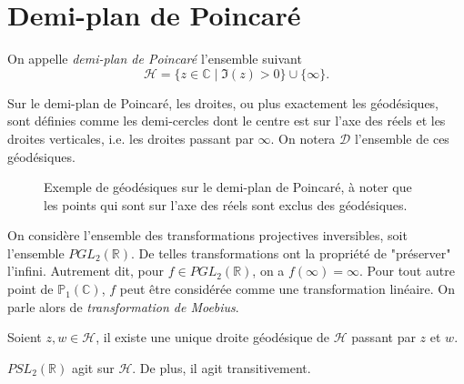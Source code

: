 \documentclass[../main.tex]{subfiles}
\begin{document}
\section{Demi-plan de Poincaré}

\begin{definition}
    On appelle \emph{demi-plan de Poincaré} l'ensemble suivant
    \begin{equation}
        \mathcal{H} = \{ z \in \mathbb{C} \mid \Im(z) > 0 \}\cup \{\infty\}.
    \end{equation}
\end{definition}
Sur le demi-plan de Poincaré, les droites, ou plus exactement les géodésiques, 
sont définies comme les demi-cercles dont le centre est sur l'axe des réels et
les droites verticales, i.e. les droites passant par $\infty$. On notera \(\mathcal{D}\)
l'ensemble de ces géodésiques.
\begin{figure}
    \caption{Exemple de géodésiques sur le demi-plan de Poincaré, à noter que les points qui sont sur l'axe des réels sont exclus des géodésiques.}
\end{figure}
On considère l'ensemble des transformations projectives inversibles, soit l'ensemble \(PGL_2(\mathbb{R})\).
De telles transformations ont la propriété de "préserver" l'infini. Autrement dit, pour 
\(f \in PGL_2(\mathbb{R})\), on a \(f(\infty) = \infty\). Pour tout autre point de \(\mathbb{P}_1(\mathbb{C})\),
\(f\) peut être considérée comme une transformation linéaire. On parle alors de \emph{transformation de Moebius}.
\begin{lemma} Soient \(z,w\in \mathcal{H}\), il existe une unique droite géodésique de \(\mathcal{H}\) passant par \(z\) et \(w\).
\end{lemma}
\begin{proposition} \(PSL_2(\mathbb{R})\) agit sur \(\mathcal{H}\). De plus,
    il agit transitivement. 
\end{proposition}
\end{document}
